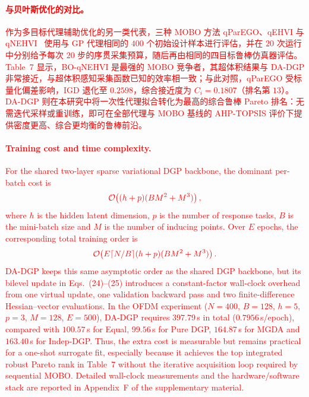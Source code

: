 \documentclass[11pt]{article}
\begin{document}
\textcolor{red}{\paragraph{与贝叶斯优化的对比。}}%
\textcolor{red}{作为多目标代理辅助优化的另一类代表，三种 MOBO 方法 qParEGO、qEHVI 与 qNEHVI~\citep{Daulton2020,Daulton2021} 使用与 GP 代理相同的 $400$ 个初始设计样本进行评估，并在 $20$ 次运行中分别给予每次 $20$ 步的序贯采集预算，随后再由相同的四目标鲁棒仿真器评估。}%
\textcolor{red}{Table~7 显示，BO-qNEHVI 是最强的 MOBO 竞争者，其超体积结果与 DA-DGP 非常接近，与超体积感知采集函数已知的效率相一致；与此对照，qParEGO 受标量化偏差影响，IGD 退化至 $0.2598$，综合接近度为 $C_{i}=0.1807$（排名第 $13$）。}%
\textcolor{red}{DA-DGP 则在本研究中将一次性代理拟合转化为最高的综合鲁棒 Pareto 排名：无需迭代采样或重训练，即可在全部代理与 MOBO 基线的 AHP-TOPSIS 评价下提供密度更高、综合更均衡的鲁棒前沿。}%

\textcolor{red}{\paragraph{Training cost and time complexity.}}%
\textcolor{red}{For the shared two-layer sparse variational DGP backbone, the dominant per-batch cost is}%
\[
\textcolor{red}{\mathcal{O}\!\left((h+p)(BM^{2}+M^{3})\right),}
\]
\textcolor{red}{where $h$ is the hidden latent dimension, $p$ is the number of response tasks, $B$ is the mini-batch size and $M$ is the number of inducing points. Over $E$ epochs, the corresponding total training order is}%
\[
\textcolor{red}{\mathcal{O}\!\left(E\lceil N/B\rceil(h+p)(BM^{2}+M^{3})\right).}
\]
\textcolor{red}{DA-DGP keeps this same asymptotic order as the shared DGP backbone, but its bilevel update in Eqs.~(24)--(25) introduces a constant-factor wall-clock overhead from one virtual update, one validation backward pass and two finite-difference Hessian--vector evaluations.}%
\textcolor{red}{In the OFDM experiment ($N=400$, $B=128$, $h=5$, $p=3$, $M=128$, $E=500$), DA-DGP requires $397.79$\,s in total ($0.7956$\,s/epoch), compared with $100.57$\,s for Equal, $99.56$\,s for Pure DGP, $164.87$\,s for MGDA and $163.40$\,s for Indep-DGP. Thus, the extra cost is measurable but remains practical for a one-shot surrogate fit, especially because it achieves the top integrated robust Pareto rank in Table~7 without the iterative acquisition loop required by sequential MOBO. Detailed wall-clock measurements and the hardware/software stack are reported in Appendix~F of the supplementary material.}%
\end{document}
